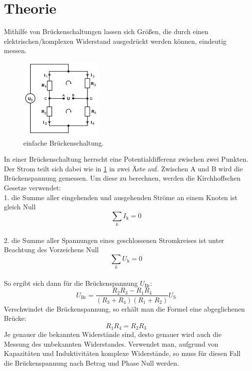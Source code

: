 \section{Theorie}

Mithilfe von Brückenschaltungen lassen sich Größen, die durch einen elektrischen/komplexen Widerstand ausgedrückt werden können, eindeutig messen. 
\begin{figure}[h]
  \centering
  \includegraphics[height=4cm]{Grafiken/1.pdf}
  \caption{einfache Brückenschaltung. \cite{1}}
  \label{fig:Brücke}
\end{figure}
In einer Brückenschaltung herrscht eine Potentialdifferenz zwischen zwei Punkten. Der Strom teilt sich dabei wie in \ref{fig:Brücke} in zwei Äste auf. 
Zwischen A und B wird die Brückenspannung gemessen. Um diese zu berechnen, werden die Kirchhoffschen Gesetze verwendet:
\\
1. die Summe aller eingehenden und ausgehenden Ströme an einem Knoten ist gleich Null
\begin{equation}
	\sum_k I_\text{k} = 0
\end{equation}
\\
2. die Summe aller Spannungen eines geschlossenen Stromkreises ist unter Beachtung des Vorzeichens Null
\begin{equation}
	\sum_k U_\text{k} = 0
\end{equation}
\\
So ergibt sich dann für die Brückenspannung $U_\text{Br}$:
\begin{equation}
	U_\text{Br} = \frac{R_2R_3 - R_1R_4}{(R_3+R_4)(R_1+R_2)}U_\text{S}
\end{equation}
Verschwindet die Brückenspannung, so erhält man die Formel eine abgeglichenen Brücke:
\begin{equation}
	R_1R_4 = R_2R_3
\end{equation}
Je genauer die bekannten Widerstände sind, desto genauer wird auch die Messung des unbekannten Widerstandes.
Verwendet man, aufgrund von Kapazitäten und Induktivitäten komplexe Widerstände, so muss für diesen Fall die Brückenspannung nach Betrag und Phase Null werden. 

